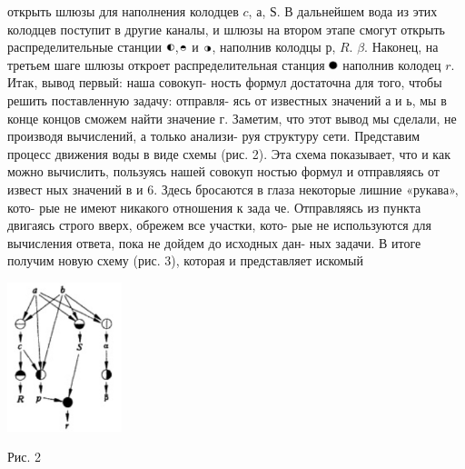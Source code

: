 \documentclass[a4paper]{article}
\begin{document}
\begin{multicols}{3}
открыть шлюзы для наполнения колодцев $c$, $а$, $Ѕ$. В дальнейшем вода из этих колодцев поступит в другие каналы, и шлюзы на втором этапе смогут открыть распределительные станции \includegraphics[width=0.02\textwidth]{круг5},\includegraphics[width=0.02\textwidth]{круг4} и \includegraphics[width=0.02\textwidth]{круг3},
наполнив колодцы $р$, $R$. $\beta$. Наконец, на третьем шаге шлюзы откроет распределительная станция \includegraphics[width=0.02\textwidth]{круг7} наполнив колодец $r$.
Итак, вывод первый: наша совокуп- ность формул достаточна для того, чтобы решить поставленную задачу: отправля- ясь от известных значений а и ь, мы в конце концов сможем найти значение г. Заметим, что этот вывод мы сделали, не производя вычислений, а только анализи- руя структуру сети.
Представим процесс движения воды в виде схемы (рис. 2).
Эта схема показывает, что и как можно вычислить, пользуясь нашей совокуп ностью формул и отправляясь от извест ных значений в и 6. Здесь бросаются в глаза некоторые лишние «рукава», кото- рые не имеют никакого отношения к зада че. Отправляясь из пункта двигаясь строго вверх, обрежем все участки, кото- рые не используются для вычисления ответа, пока не дойдем до исходных дан- ных задачи. В итоге получим новую схему (рис. 3), которая и представляет искомый
\begin{center}\includegraphics[width=0.25\textwidth]{многокруов1} \end{center}
\begin{flushleft}Рис. 2\end{flushleft}
	\end{multicols}
	\newpage
\end{document}
